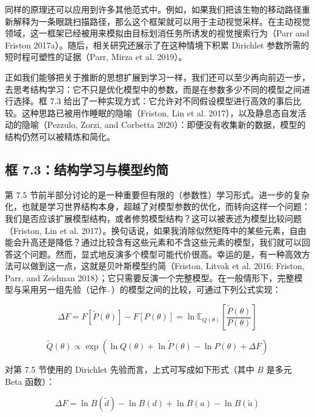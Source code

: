 同样的原理还可以应用到许多其他范式中。例如，如果我们把该生物的移动路径重新解释为一条眼跳扫描路径，那么这个框架就可以用于主动视觉采样。在主动视觉领域，这一框架已经被用来模拟由目标划消任务所诱发的视觉搜索行为（Parr and Friston 2017a）。随后，相关研究还展示了在这种情境下积累 Dirichlet 参数所需的短时程可塑性的证据（Parr, Mirza et al. 2019）。

正如我们能够把关于推断的思想扩展到学习一样，我们还可以至少再向前迈一步，去思考结构学习：它不只是优化模型中的参数，而是在参数多少不同的模型之间进行选择。框 7.3 给出了一种实现方式：它允许对不同假设模型进行高效的事后比较。这种思路已被用作睡眠的隐喻（Friston, Lin et al. 2017），以及静息态自发活动的隐喻（Pezzulo, Zorzi, and Corbetta 2020）：即便没有收集新的数据，模型的结构仍然可以被精炼和简化。

\subsection*{框 7.3：结构学习与模型约简}

第 7.5 节前半部分讨论的是一种重要但有限的（参数性）学习形式。进一步的复杂化，也就是学习世界结构本身，超越了对模型参数的优化，而转向这样一个问题：我们是否应该扩展模型结构，或者修剪模型结构？这可以被表述为模型比较问题（Friston, Lin et al. 2017）。换句话说，如果我消除似然矩阵中的某些元素，自由能会升高还是降低？通过比较含有这些元素和不含这些元素的模型，我们就可以回答这个问题。然而，显式地反演多个模型可能代价很高。幸运的是，有一种高效方法可以做到这一点，这就是贝叶斯模型约简（Friston, Litvak et al. 2016; Friston, Parr, and Zeidman 2018）；它只需要反演一个完整模型。在一般情形下，完整模型与采用另一组先验（记作 $\tilde{\ }$）的模型之间的比较，可通过下列公式实现：

\begin{equation}
\Delta F = F[\tilde{P}(\theta)]-F[P(\theta)] = \ln \mathbb{E}_{Q(\theta)}\!\left[\frac{\tilde{P}(\theta)}{P(\theta)}\right]
\end{equation}

\begin{equation}
\tilde{Q}(\theta)\propto \exp\!\left(\ln Q(\theta)+\ln \tilde{P}(\theta)-\ln P(\theta)+\Delta F\right)
\end{equation}

对第 7.5 节使用的 Dirichlet 先验而言，上式可写成如下形式（其中 $B$ 是多元 Beta 函数）：

\begin{equation}
\Delta F = \ln B(\tilde{d})-\ln B(d)+\ln B(a)-\ln B(\tilde{a})
\end{equation}

